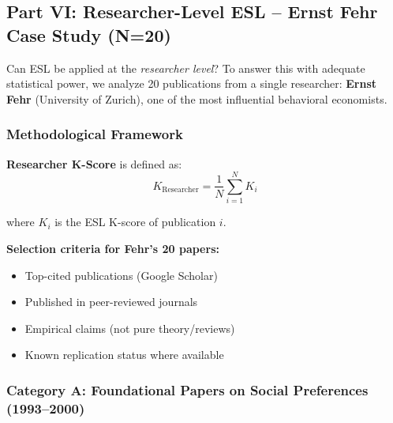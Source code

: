 \documentclass[11pt,a4paper]{article}
\begin{document}

\subsection{Part VI: Researcher-Level ESL -- Ernst Fehr Case Study (N=20)}

Can ESL be applied at the \textit{researcher level}? To answer this with adequate statistical power, we analyze 20 publications from a single researcher: \textbf{Ernst Fehr} (University of Zurich), one of the most influential behavioral economists.

\subsubsection{Methodological Framework}

\textbf{Researcher K-Score} is defined as:
\[
K_{\text{Researcher}} = \frac{1}{N} \sum_{i=1}^{N} K_i
\]

where $K_i$ is the ESL K-score of publication $i$.

\textbf{Selection criteria for Fehr's 20 papers:}
\begin{itemize}
    \item Top-cited publications (Google Scholar)
    \item Published in peer-reviewed journals
    \item Empirical claims (not pure theory/reviews)
    \item Known replication status where available
\end{itemize}

\subsubsection{Category A: Foundational Papers on Social Preferences (1993--2000)}
\end{document}
